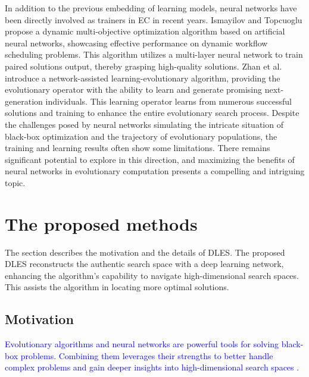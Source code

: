 \documentclass[journal,twoside]{IEEEtran}
\begin{document}
In addition to the previous embedding of learning models, neural networks have been directly involved as trainers in EC in recent years. Ismayilov and Topcuoglu \cite{ismayilov2020neural} propose a dynamic multi-objective optimization algorithm based on artificial neural networks, showcasing effective performance on dynamic workflow scheduling problems. This algorithm utilizes a multi-layer neural network to train paired solutions output, thereby grasping high-quality solutions. Zhan et al. \cite{10002945} introduce a network-assisted learning-evolutionary algorithm, providing the evolutionary operator with the ability to learn and generate promising next-generation individuals. This learning operator learns from numerous successful solutions and training to enhance the entire evolutionary search process. Despite the challenges posed by neural networks simulating the intricate situation of black-box optimization and the trajectory of evolutionary populations, the training and learning results often show some limitations. There remains significant potential to explore in this direction, and maximizing the benefits of neural networks in evolutionary computation presents a compelling and intriguing topic.

\section{The proposed methods}\label{methods}
The section describes the motivation and the details of DLES. The proposed DLES reconstructs the authentic search space with a deep learning network, enhancing the algorithm's capability to navigate high-dimensional search spaces. This assists the algorithm in locating more optimal solutions.  

\subsection{Motivation}
\textcolor{blue}{
Evolutionary algorithms and neural networks are powerful tools for solving black-box problems. Combining them leverages their strengths to better handle complex problems and gain deeper insights into high-dimensional search spaces \cite{10068274}.}
\end{document}
